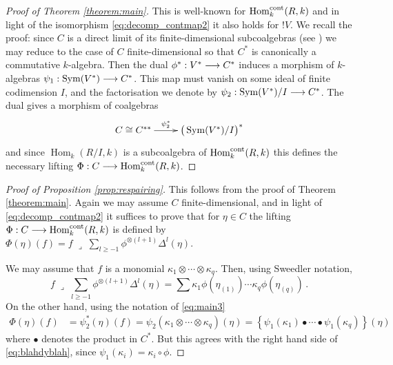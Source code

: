\documentclass[english,letter paper,12pt,reqno]{article}
\theoremstyle{example}
\numberwithin{equation}{section}
\def\Hom{\operatorname{Hom}}
\DeclareMathOperator{\Sym}{Sym}
\def\contract{\;\lrcorner\;}
\begin{document}
\begin{proof}[Proof of Theorem \ref{theorem:main}] This is well-known for $\Hom_k^{\cont}(R,k)$ \cite[Section 6]{sweedler} and in light of the isomorphism \eqref{eq:decomp_contmap2} it also holds for ${!} V$. We recall the proof: since $C$ is a direct limit of its finite-dimensional subcoalgebras (see \cite[\S 2.2]{sweedler}) we may reduce to the case of $C$ finite-dimensional so that $C^*$ is canonically a commutative $k$-algebra. Then the dual $\phi^*: V^* \longrightarrow C^*$ induces a morphism of $k$-algebras $\psi_1: \Sym(V^*) \lto C^*$. This map must vanish on some ideal of finite codimension $I$, and the factorisation we denote by $\psi_2: \Sym(V^*)/I \lto C^*$. The dual gives a morphism of coalgebras
\begin{equation}\label{eq:main3}
\xymatrix{
C \cong C^{**} \ar[r]^-{\psi_2^*} & \big( \Sym(V^*)/I \big)^*
}
\end{equation}
and since $\Hom_k( R/I, k )$ is a subcoalgebra of $\Hom^{\cont}_k(R,k)$ this defines the necessary lifting $\Phi: C \lto \Hom^{\cont}_k(R,k)$.
\end{proof}

\begin{proof}[Proof of Proposition \ref{prop:respairing}] This follows from the proof of Theorem \ref{theorem:main}. Again we may assume $C$ finite-dimensional, and in light of \eqref{eq:decomp_contmap2} it suffices to prove that for $\eta \in C$ the lifting $\Phi: C \lto \Hom^{\cont}_k(R,k)$ is defined by $\Phi( \eta )(f) = f \contract \sum_{l \ge -1} \phi^{\otimes(l+1)} \Delta^l( \eta )$.

We may assume that $f$ is a monomial $\kappa_1 \otimes \cdots \otimes \kappa_q$. Then, using Sweedler notation,
\begin{equation}\label{eq:blahdyblah}
f \contract \sum_{l \ge -1} \phi^{\otimes (l+1)} \Delta^l( \eta ) = \sum \kappa_1 \phi( \eta_{(1)} ) \cdots \kappa_q \phi( \eta_{(q)} )\,.
\end{equation}
On the other hand, using the notation of \eqref{eq:main3}
\begin{align*}
\Phi( \eta )(f) &= \psi_2^*( \eta )( f ) = \psi_2( \kappa_1 \otimes \cdots \otimes \kappa_q )( \eta )
= \left\{ \psi_1( \kappa_1 ) \bullet \cdots \bullet \psi_1( \kappa_q ) \right\}(\eta)
\end{align*}
where $\bullet$ denotes the product in $C^*$. But this agrees with the right hand side of \eqref{eq:blahdyblah}, since $\psi_1(\kappa_i) = \kappa_i \circ \phi$.
\end{proof}
\end{document}
